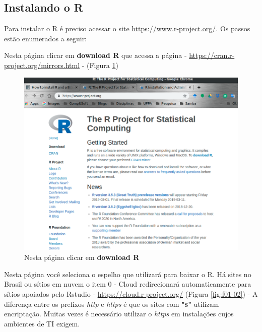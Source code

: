 \documentclass[12pt,a4paper,oneside]{erdc}
\begin{document}
\subsection{Instalando o R}

Para instalar o R é preciso acessar o site \url{https://www.r-project.org/}. Os passos estão enumerados a seguir:

Nesta página clicar em \textbf{download R} que acessa a página - \url{https://cran.r-project.org/mirrors.html} - (Figura \ref{fig:f01-01})





\begin{figure}[htpb]
	\centering
	\includegraphics[width=\linewidth]{../figs/BP_Curso_TecComp_00_2019_f01-01}
	\caption{Nesta página clicar em \textbf{download R}}
	\label{fig:f01-01}
\end{figure}

Nesta página você seleciona o espelho que utilizará para baixar o R. Há sites no Brasil ou sítios em nuvem o item 0 - Cloud redirecionará automaticamente para sítios apoiados pelo Rstudio  -  \url{https://cloud.r-project.org/} (Figura \ref{fig:f01-02}) - A diferença entre os prefixos \textit{http} e \textit{https} é que os sites com \textbf{"s"} utilizam encriptação. Muitas vezes é necessário utilizar o \textit{https} em instalações cujos ambientes de TI exigem.
\end{document}
